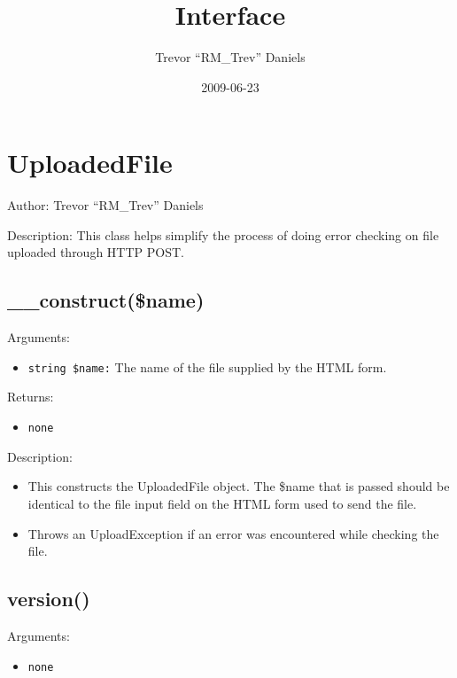 \documentclass[10pt]{article}
\title{Interface}
\author{Trevor ``RM\_Trev'' Daniels}
\date{2009-06-23}
\begin{document}
\maketitle
{}

\section{UploadedFile}
\noindent Author: Trevor ``RM\_Trev'' Daniels

\noindent Description: This class helps simplify the process of doing error checking on file uploaded through HTTP POST.


\subsection{\_\_construct(\$name)}

\noindent Arguments:
\begin{itemize}
\item \verb!string $name:! The name of the file supplied by the HTML form.
\end{itemize}

\noindent Returns:
\begin{itemize}
\item \verb!none!
\end{itemize}

\noindent Description:
\begin{itemize}
\item This constructs the UploadedFile object.  The \$name that is passed should be identical to the file input field on the HTML form used to send the file.
\item Throws an UploadException if an error was encountered while checking the file.
\end{itemize}


\subsection{version()}

\noindent Arguments:
\begin{itemize}
\item \verb!none!
\end{itemize}
\end{document}
